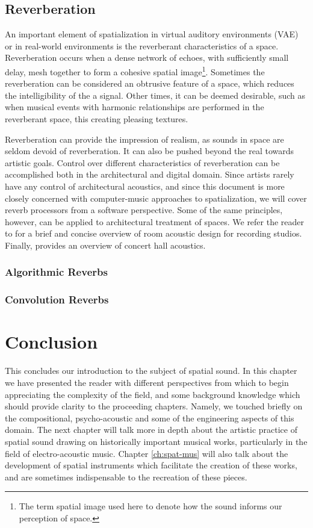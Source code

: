 \subsection{Reverberation}

An important element of spatialization in virtual auditory environments (VAE) or in real-world environments is the reverberant characteristics of a space. Reverberation occurs when a dense network of echoes, with sufficiently small delay, mesh together to form a cohesive spatial image\footnote{The term spatial image used here to denote how the sound informs our perception of space.}. Sometimes the reverberation can be considered an obtrusive feature of a space, which reduces the intelligibility of the a signal. Other times, it can be deemed desirable, such as when musical events with harmonic relationships are performed in the reverberant space, this creating pleasing textures. 

Reverberation can provide the impression of realism, as sounds in space are seldom devoid of reverberation. It can also be pushed beyond the real towards artistic goals. Control over different characteristics of reverberation can be accomplished both in the architectural and digital domain. Since artists rarely have any control of architectural acoustics, and since this document is more closely concerned with computer-music approaches to spatialization, we will cover reverb processors from a software perspective. Some of the same principles, however, can be applied to architectural treatment of spaces. We refer the reader to \cite{gupta2019analysis} for a brief and concise overview of room acoustic design for recording studios. Finally, \cite{beranek1992concert} provides an overview of concert hall acoustics. 


\subsubsection{Algorithmic Reverbs}
\subsubsection{Convolution Reverbs}

\section{Conclusion}
This concludes our introduction to the subject of spatial sound. In this chapter we have presented the reader with different perspectives from which to begin appreciating the complexity of the field, and some background knowledge which should provide clarity to the proceeding chapters. Namely, we touched briefly on the compositional, psycho-acoustic and some of the engineering aspects of this domain. The next chapter will talk more in depth about the artistic practice of spatial sound drawing on historically important musical works, particularly in the field of electro-acoustic music. Chapter \ref{ch:spat-mus} will also talk about the development of spatial instruments which facilitate the creation of these works, and are sometimes indispensable to the recreation of these pieces.